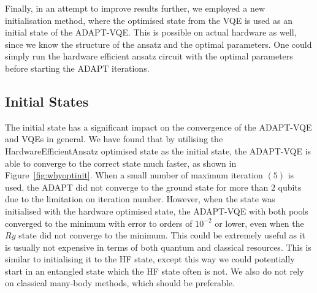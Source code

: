 Finally, in an attempt to improve results further, we employed a new initialisation method, where the optimised state from the VQE is used as an initial state of the ADAPT-VQE. This is possible on actual hardware as well, since we know the structure of the ansatz and the optimal parameters. One could simply run the hardware efficient ansatz circuit with the optimal parameters before starting the ADAPT iterations.

\subsection{Initial States}
\label{sub:deuteron_initstate}
The initial state has a significant impact on the convergence of the ADAPT-VQE and VQEs in general. We have found that by utilising the HardwareEfficientAnsatz optimised state as the initial state, the ADAPT-VQE is able to converge to the correct state much faster, as shown in Figure~\ref{fig:whyoptinit}. When a small number of maximum iteration $ (5) $ is used, the ADAPT did not converge to the ground state for more than $ 2 $ qubits due to the limitation on iteration number. However, when the state was initialised with the hardware optimised state, the ADAPT-VQE with both pools converged to the minimum with error to orders of $ 10^{-2} $ or lower, even when the $ Ry $ state did not converge to the minimum. This could be extremely useful as it is usually not expensive in terms of both quantum and classical resources. This is similar to initialising it to the  HF state, except this way we could potentially start in an entangled state which the HF state often is not. We also do not rely on classical many-body methods, which should be preferable.

